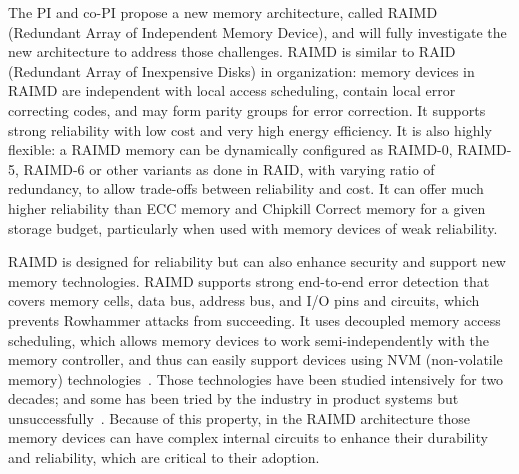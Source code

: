 \documentclass[11pt]{article}
\begin{document}


The PI and co-PI propose a new memory architecture, called RAIMD (Redundant
Array of Independent Memory Device), and will fully investigate the new
architecture to address those challenges.  RAIMD is similar to RAID (Redundant
Array of Inexpensive Disks) in organization: memory devices in RAIMD are
independent with local access scheduling, contain local error correcting codes,
and may form parity groups for error correction.  It supports strong reliability
with low cost and very high energy efficiency.  It is also highly flexible: a
RAIMD memory can be dynamically configured as RAIMD-0, RAIMD-5, RAIMD-6 or other
variants as done in RAID, with varying ratio of redundancy, to allow trade-offs
between reliability and cost.  It can offer much higher reliability than ECC
memory and Chipkill Correct memory for a given storage budget, particularly when
used with memory devices of weak reliability.


RAIMD is designed for reliability but can also enhance security and support new
memory technologies.  RAIMD supports strong end-to-end error detection that
covers memory cells, data bus, address bus, and I/O pins and circuits, which
prevents Rowhammer attacks from succeeding.  It uses decoupled memory access
scheduling, which allows memory devices to work semi-independently with the
memory controller, and thus can easily support devices using NVM (non-volatile
memory)
technologies~\cite{Lee:ISCA09,Zhou:ISCA09,Qureshi:ISCA09,Qureshi:HPCA10}.  Those
technologies have been studied intensively for two decades; and some has been
tried by the industry in product systems but
unsuccessfully~\cite{Waddington:memsys19}.  Because of this property, in the
RAIMD architecture those memory devices can have complex internal circuits to enhance
their durability and reliability, which are critical to their adoption.

\end{document}
